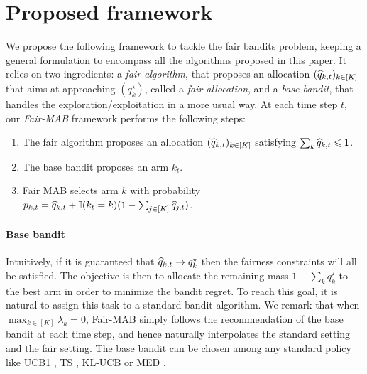 \section{Proposed framework}


We propose the following framework to tackle the fair bandits problem, keeping a general formulation to encompass all the algorithms proposed in this paper. It relies on two ingredients: a \emph{fair algorithm}, that proposes an allocation $(\widehat{q}_{k,t})_{k\in [K]}$ that aims at approaching $(q_k^\star)$, called a \emph{fair allocation}, and a \emph{base bandit}, that handles the exploration/exploitation in a more usual way. At each time step $t$, our \emph{Fair-MAB} framework performs the following steps:

\begin{enumerate}
\item The fair algorithm proposes an allocation $(\widehat{q}_{k,t})_{k\in [K]}$ satisfying $\sum_k \widehat{q}_{k, t}\leqslant1$.
\item The base bandit proposes an arm $k_t$.
\item Fair MAB selects arm $k$ with probability $p_{k, t}= \widehat{q}_{k,t} + \mathbb{I}(k_t=k)(1-\sum_{j \in [K]}\widehat{q}_{j, t})$.
\end{enumerate}

\paragraph{Base bandit} Intuitively, 
if it is guaranteed that $\widehat{q}_{k, t} \rightarrow q_k^\star$ then the fairness constraints will all be satisfied. The objective is then to allocate the remaining mass $1-\sum_k q_k^\star$ to the best arm in order to minimize the bandit regret. To reach this goal, it is natural to assign this task to a standard bandit algorithm. We remark that when $\max_{k \in [K]} \lambda_k= 0$, Fair-MAB simply follows the recommendation of the base bandit at each time step, and hence naturally interpolates the standard setting and the fair setting. The base bandit can be chosen among any standard policy like UCB1 \citep{auer2002finite}, TS \citep{TS_1933, TS12AG}, KL-UCB \citep{KL_UCB} or MED \citep{honda11MED, baudry2023general}. %

